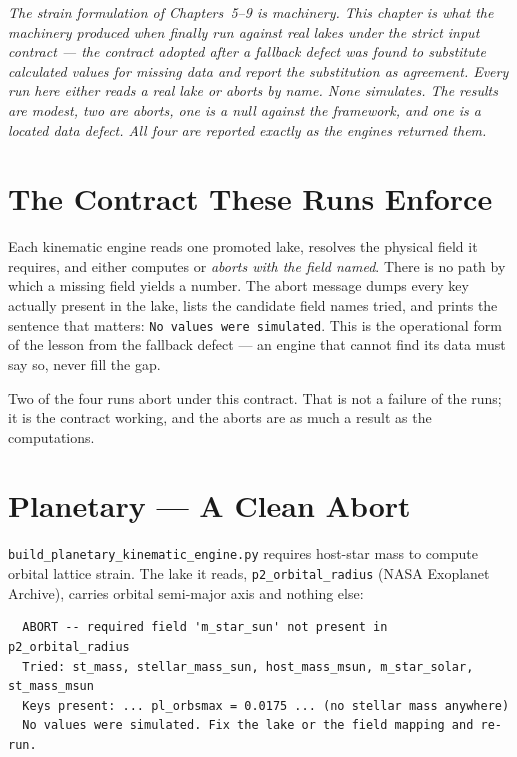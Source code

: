 \documentclass[11pt, letterpaper, openany]{book}
\begin{document}
\begin{center}
\textit{The strain formulation of Chapters~5--9 is machinery. This chapter is what the machinery
produced when finally run against real lakes under the strict input contract --- the contract
adopted after a fallback defect was found to substitute calculated values for missing data and
report the substitution as agreement. Every run here either reads a real lake or aborts by name.
None simulates. The results are modest, two are aborts, one is a null against the framework, and
one is a located data defect. All four are reported exactly as the engines returned them.}
\end{center}

\section{The Contract These Runs Enforce}

Each kinematic engine reads one promoted lake, resolves the physical field it requires, and either
computes or \emph{aborts with the field named}. There is no path by which a missing field yields a
number. The abort message dumps every key actually present in the lake, lists the candidate field
names tried, and prints the sentence that matters: \texttt{No values were simulated}. This is the
operational form of the lesson from the fallback defect --- an engine that cannot find its data must
say so, never fill the gap.

Two of the four runs abort under this contract. That is not a failure of the runs; it is the
contract working, and the aborts are as much a result as the computations.

\section{Planetary --- A Clean Abort}

\texttt{build\_planetary\_kinematic\_engine.py} requires host-star mass to compute orbital lattice
strain. The lake it reads, \texttt{p2\_orbital\_radius} (NASA Exoplanet Archive), carries orbital
semi-major axis and nothing else:

\begin{lstlisting}
  ABORT -- required field 'm_star_sun' not present in p2_orbital_radius
  Tried: st_mass, stellar_mass_sun, host_mass_msun, m_star_solar, st_mass_msun
  Keys present: ... pl_orbsmax = 0.0175 ... (no stellar mass anywhere)
  No values were simulated. Fix the lake or the field mapping and re-run.
\end{lstlisting}
\end{document}
